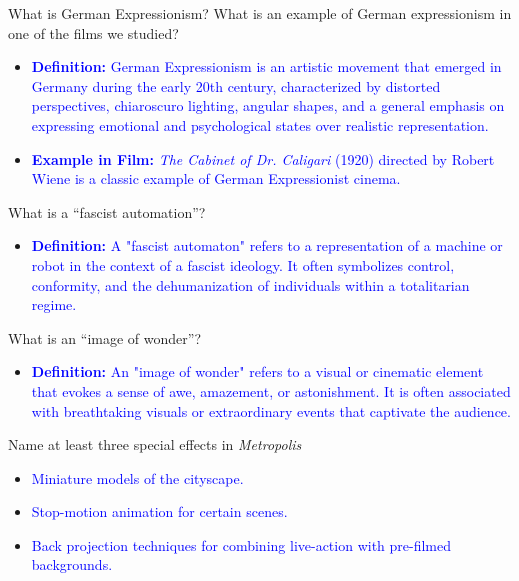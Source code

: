 \documentclass[11pt,fleqn]{book}
\begin{document}
\begin{exercise}
    What is German Expressionism? What is an example of German expressionism in one of the films we studied?
    \begin{itemize}
        \item \textcolor{blue}{\textbf{Definition:} German Expressionism is an artistic movement that emerged in Germany during the early 20th century, characterized by distorted perspectives, chiaroscuro lighting, angular shapes, and a general emphasis on expressing emotional and psychological states over realistic representation.}
        \item \textcolor{blue}{\textbf{Example in Film:} \textit{The Cabinet of Dr. Caligari} (1920) directed by Robert Wiene is a classic example of German Expressionist cinema.}
    \end{itemize}
\end{exercise}

\begin{exercise}
    What is a \enquote{fascist automation}?
        \begin{itemize}
            \item \textcolor{blue}{\textbf{Definition:} A "fascist automaton" refers to a representation of a machine or robot in the context of a fascist ideology. It often symbolizes control, conformity, and the dehumanization of individuals within a totalitarian regime.}
        \end{itemize}
\end{exercise}

\begin{exercise}
    What is an \enquote{image of wonder}?
        \begin{itemize}
            \item \textcolor{blue}{\textbf{Definition:} An "image of wonder" refers to a visual or cinematic element that evokes a sense of awe, amazement, or astonishment. It is often associated with breathtaking visuals or extraordinary events that captivate the audience.}
        \end{itemize}
\end{exercise}

\begin{exercise}
    Name at least three special effects in \textit{Metropolis}
        \begin{itemize}
            \item \textcolor{blue}{Miniature models of the cityscape.}
            \item \textcolor{blue}{Stop-motion animation for certain scenes.}
            \item \textcolor{blue}{Back projection techniques for combining live-action with pre-filmed backgrounds.}
        \end{itemize}
\end{exercise}
\end{document}
